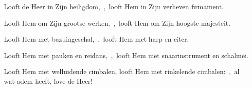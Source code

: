 \documentclass[12pt,twoside,a5paper]{article}
\begin{document}

\begin{halfparskip}
  Looft de Heer in Zijn heiligdom,~\sep\ looft Hem in Zijn verheven firmament.


  Looft Hem om Zijn grootse werken,~\sep\ looft Hem om Zijn hoogste majesteit.

  Looft Hem met bazuingeschal,~\sep\ looft Hem met harp en citer.

  Looft Hem met pauken en reidans,~\sep\ looft Hem met snaarinstrument en schalmei.

  Looft Hem met welluidende cimbalen, looft Hem met rinkelende cimbalen:~\sep\ al wat adem heeft, love de Heer!
\end{halfparskip}





\end{document}
